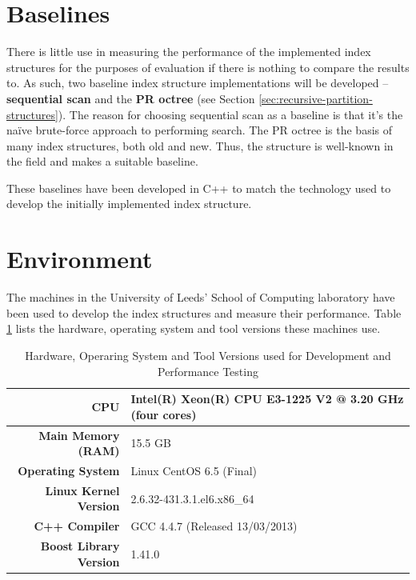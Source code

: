 \section{Baselines}
\label{sec:baselines}

There is little use in measuring the performance of the implemented index structures for the purposes of evaluation if there is nothing to compare the results to. As such, two baseline index structure implementations will be developed -- \textbf{sequential scan} and the \textbf{PR octree} (see Section \ref{sec:recursive-partition-structures}). The reason for choosing sequential scan as a baseline is that it's the na\"{i}ve brute-force approach to performing search. The PR octree is the basis of many index structures, both old and new. Thus, the structure is well-known in the field and makes a suitable baseline.

These baselines have been developed in C++ to match the technology used to develop the initially implemented index structure.

\section{Environment}

The machines in the University of Leeds' School of Computing laboratory have been used to develop the index structures and measure their performance. Table \ref{tab:system-specifications} lists the hardware, operating system and tool versions these machines use.

\begin{table}
	\centering
	\begin{tabular}{|r|l|}
		\hline
		\textbf{CPU} & Intel(R) Xeon(R) CPU E3-1225 V2 @ 3.20 GHz (four cores) \\
		\hline
		\textbf{Main Memory (RAM)} & 15.5 GB \\
		\hline
		\textbf{Operating System} & Linux CentOS 6.5 (Final) \\
		\hline
		\textbf{Linux Kernel Version} & 2.6.32-431.3.1.el6.x86\_64 \\
		\hline
		\textbf{C++ Compiler} & GCC 4.4.7 (Released 13/03/2013) \\
		\hline
		\textbf{Boost Library Version} & 1.41.0 \\
		\hline
	\end{tabular}
	\caption{Hardware, Operaring System and Tool Versions used for Development and Performance Testing}
	\label{tab:system-specifications}
\end{table}

